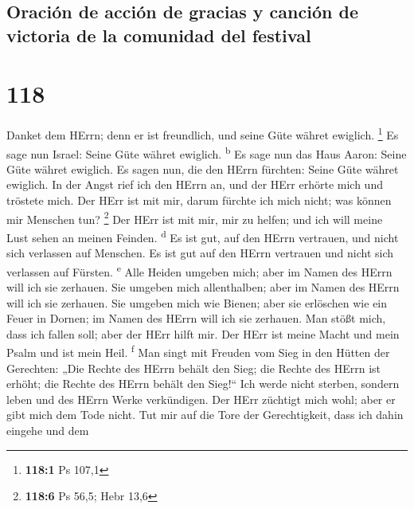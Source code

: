 \hypertarget{oraciuxf3n-de-acciuxf3n-de-gracias-y-canciuxf3n-de-victoria-de-la-comunidad-del-festival}{%
\subsection{Oración de acción de gracias y canción de victoria de la
comunidad del
festival}\label{oraciuxf3n-de-acciuxf3n-de-gracias-y-canciuxf3n-de-victoria-de-la-comunidad-del-festival}}

\hypertarget{section-117}{%
\section{118}\label{section-117}}

 Danket dem HErrn; denn er ist freundlich, und seine Güte
währet ewiglich. \footnote{\textbf{118:1} Ps 107,1}  Es
sage nun Israel: Seine Güte währet ewiglich. \textsuperscript{b}
 Es sage nun das Haus Aaron: Seine Güte währet ewiglich.
 Es sagen nun, die den HErrn fürchten: Seine Güte währet
ewiglich.  In der Angst rief ich den HErrn an, und der
HErr erhörte mich und tröstete mich.  Der HErr ist mit
mir, darum fürchte ich mich nicht; was können mir Menschen tun?
\footnote{\textbf{118:6} Ps 56,5; Hebr 13,6}  Der HErr ist
mit mir, mir zu helfen; und ich will meine Lust sehen an meinen Feinden.
\textsuperscript{d}  Es ist gut, auf den HErrn vertrauen,
und nicht sich verlassen auf Menschen.  Es ist gut auf den
HErrn vertrauen und nicht sich verlassen auf Fürsten.
\textsuperscript{e}  Alle Heiden umgeben mich; aber im
Namen des HErrn will ich sie zerhauen.  Sie umgeben mich
allenthalben; aber im Namen des HErrn will ich sie zerhauen.
 Sie umgeben mich wie Bienen; aber sie erlöschen wie ein
Feuer in Dornen; im Namen des HErrn will ich sie zerhauen.
 Man stößt mich, dass ich fallen soll; aber der HErr
hilft mir.  Der HErr ist meine Macht und mein Psalm und
ist mein Heil. \textsuperscript{f}  Man singt mit Freuden
vom Sieg in den Hütten der Gerechten: „Die Rechte des HErrn behält den
Sieg;  die Rechte des HErrn ist erhöht; die Rechte des
HErrn behält den Sieg!{}``  Ich werde nicht sterben,
sondern leben und des HErrn Werke verkündigen.  Der HErr
züchtigt mich wohl; aber er gibt mich dem Tode nicht. 
Tut mir auf die Tore der Gerechtigkeit, dass ich dahin eingehe und dem
